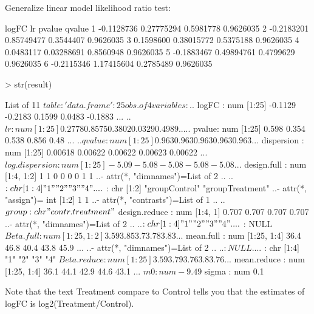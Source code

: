 \documentclass[12pt]{article}
\begin{document}
Generalize linear model likelihood ratio test:
\begin{Schunk}
\begin{Soutput}
       logFC         lr    pvalue    qvalue
1 -0.1128736 0.27775294 0.5981778 0.9626035
2 -0.2183201 0.85749477 0.3544407 0.9626035
3  0.1598600 0.38015772 0.5375188 0.9626035
4  0.0483117 0.03288691 0.8560948 0.9626035
5 -0.1883467 0.49894761 0.4799629 0.9626035
6 -0.2115346 1.17415604 0.2785489 0.9626035
\end{Soutput}
\begin{Sinput}
> str(result)
\end{Sinput}
\begin{Soutput}
List of 11
 $ table         :'data.frame':	25 obs. of  4 variables:
  ..$ logFC : num [1:25] -0.1129 -0.2183 0.1599 0.0483 -0.1883 ...
  ..$ lr    : num [1:25] 0.2778 0.8575 0.3802 0.0329 0.4989 ...
  ..$ pvalue: num [1:25] 0.598 0.354 0.538 0.856 0.48 ...
  ..$ qvalue: num [1:25] 0.963 0.963 0.963 0.963 0.963 ...
 $ dispersion    : num [1:25] 0.00618 0.00622 0.00622 0.00623 0.00622 ...
 $ log.dispersion: num [1:25] -5.09 -5.08 -5.08 -5.08 -5.08 ...
 $ design.full   : num [1:4, 1:2] 1 1 0 0 0 0 1 1
  ..- attr(*, "dimnames")=List of 2
  .. ..$ : chr [1:4] "1" "2" "3" "4"
  .. ..$ : chr [1:2] "groupControl" "groupTreatment"
  ..- attr(*, "assign")= int [1:2] 1 1
  ..- attr(*, "contrasts")=List of 1
  .. ..$ group: chr "contr.treatment"
 $ design.reduce : num [1:4, 1] 0.707 0.707 0.707 0.707
  ..- attr(*, "dimnames")=List of 2
  .. ..$ : chr [1:4] "1" "2" "3" "4"
  .. ..$ : NULL
 $ Beta.full     : num [1:25, 1:2] 3.59 3.85 3.7 3.78 3.83 ...
 $ mean.full     : num [1:25, 1:4] 36.4 46.8 40.4 43.8 45.9 ...
  ..- attr(*, "dimnames")=List of 2
  .. ..$ : NULL
  .. ..$ : chr [1:4] "1" "2" "3" "4"
 $ Beta.reduce   : num [1:25] 3.59 3.79 3.76 3.8 3.76 ...
 $ mean.reduce   : num [1:25, 1:4] 36.1 44.1 42.9 44.6 43.1 ...
 $ m0            : num -9.49
 $ sigma         : num 0.1
\end{Soutput}
\end{Schunk}

Note that the text Treatment compare to Control tells you that the estimates 
of logFC is log2(Treatment/Control).
\end{document}
